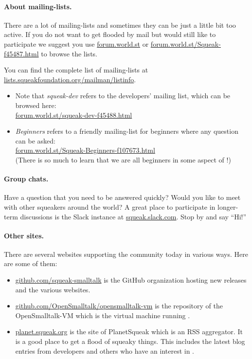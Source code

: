 \documentclass[a4paper,10pt,twoside]{book}
\begin{document}
\paragraph{About mailing-lists.}
There are a lot of mailing-lists and sometimes they can be just a little bit too active.
If you do not want to get flooded by mail but would still like to participate we suggest you use \url{forum.world.st} or \url{forum.world.st/Squeak-f45487.html} to browse the lists.

You can find the complete list of \sq mailing-lists at \url{lists.squeakfoundation.org/mailman/listinfo}.

\begin{itemize}
\item Note that \emph{squeak-dev} refers to the developers' mailing list, which can be browsed here:\\
\url{forum.world.st/squeak-dev-f45488.html}
\item \emph{Beginners} refers to a friendly mailing-list for beginners where any question can be asked:\\
\url{forum.world.st/Squeak-Beginners-f107673.html}\\
(There is so much to learn that we are all beginners in some aspect of \sq!)
\end{itemize}

\paragraph{Group chats.}
Have a question that you need to be answered quickly?
Would you like to meet with other squeakers around the world?
A great place to participate in longer-term discussions is the Slack instance at \url{squeak.slack.com}.
Stop by and say ``Hi!''

\paragraph{Other sites.} There are several websites supporting the \sq community today in various ways.
Here are some of them:
\begin{itemize}
  \item \url{github.com/squeak-smalltalk} is the GitHub organization hosting new releases and the various \sq websites.

  \item \url{github.com/OpenSmalltalk/opensmalltalk-vm} is the repository of the OpenSmalltalk-VM which is the virtual machine running \sq.

  \item \url{planet.squeak.org} is the site of PlanetSqueak which is an RSS aggregator.
  It is a good place to get a flood of squeaky things.
  This includes the latest blog entries from developers and others who have an interest in \sq.
\end{itemize}
\end{document}
